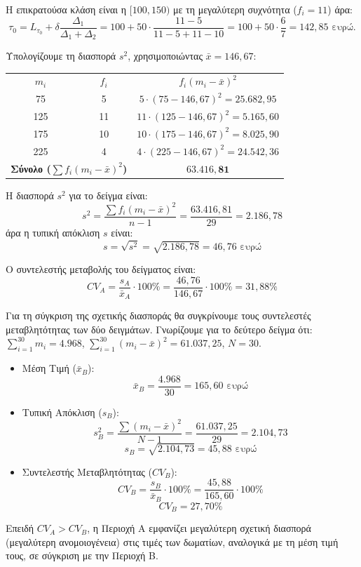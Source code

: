 \documentclass[11pt,a4paper]{article}
\begin{document}
\begin{Alist}
\begin{rlist}
\item Η επικρατούσα κλάση είναι η $[100, 150)$ με τη μεγαλύτερη συχνότητα ($f_i=11$) άρα:
$$\tau_0=L_{\tau_0}+\delta\dfrac{\Delta_1}{\Delta_1+\Delta_2} = 100+50\cdot\dfrac{11-5}{11-5+11-10}=100+50\cdot\frac{6}{7}=142{,}85 \text{ ευρώ.}$$
\item Υπολογίζουμε τη διασπορά $s^2$, χρησιμοποιώντας $\bar{x} = 146,67$:
\begin{center}
\begin{tabular}{|c|c|c|}
\hline
$m_i$ & $f_i$ & $f_i(m_i - \bar{x})^2$ \\
\hhline{===}
75 & 5 & $5 \cdot (75 - 146,67)^2 = 25.682,95$ \\
\hline
125 & 11 & $11 \cdot (125 - 146,67)^2 = 5.165,60$ \\
\hline
175 & 10 & $10 \cdot (175 - 146,67)^2 = 8.025,90$ \\
\hline
225 & 4 & $4 \cdot (225 - 146,67)^2 = 24.542,36$ \\
\hline
\multicolumn{2}{|r|}{\textbf{Σύνολο ($\sum f_i(m_i - \bar{x})^2$)}} & $\mathbf{63.416,81}$ \\
\hline
\end{tabular}
\end{center}
Η διασπορά $s^2$ για το δείγμα είναι:
$$s^2 = \frac{\sum f_i(m_i - \bar{x})^2}{n-1} = \frac{63.416,81}{29} = 2.186,78$$
άρα η τυπική απόκλιση $s$ είναι:
$$s = \sqrt{s^2} = \sqrt{2.186,78}= 46,76 \text{ ευρώ}$$
\item Ο συντελεστής μεταβολής του δείγματος είναι:
$$CV_A = \frac{s_A}{\bar{x}_A} \cdot 100\% = \frac{46,76}{146,67} \cdot 100\% = 31,88\%$$
\end{rlist}
\item Για τη σύγκριση της σχετικής διασποράς θα συγκρίνουμε τους συντελεστές μεταβλητότητας των δύο δειγμάτων. Γνωρίζουμε για το δεύτερο δείγμα ότι: $\sum_{i=1}^{30} m_i = 4.968$, $\sum_{i=1}^{30} (m_i - \bar{x})^2 = 61.037,25$, $N=30$.
\begin{itemize}
    \item {Μέση Τιμή ($\bar{x}_B$):}
    $$\bar{x}_B = \frac{4.968}{30} = {165,60 \text{ ευρώ}}$$
    \item {Τυπική Απόκλιση ($s_B$):}
    $$s_B^2 = \frac{\sum (m_i - \bar{x})^2}{N-1} = \frac{61.037,25}{29} = 2.104,73$$
    $$s_B = \sqrt{2.104,73} = {45,88 \text{ ευρώ}}$$
    \item {Συντελεστής Μεταβλητότητας ($CV_B$):}
    $$CV_B = \frac{s_B}{\bar{x}_B} \cdot 100\% = \frac{45,88}{165,60} \cdot 100\%$$
    $${CV_B = 27,70\%}$$
\end{itemize}
Επειδή $CV_A > CV_B$, η {Περιοχή A} εμφανίζει {μεγαλύτερη σχετική διασπορά} (μεγαλύτερη ανομοιογένεια) στις τιμές των δωματίων, αναλογικά με τη μέση τιμή τους, σε σύγκριση με την Περιοχή Β.
\end{Alist}
\end{document}

